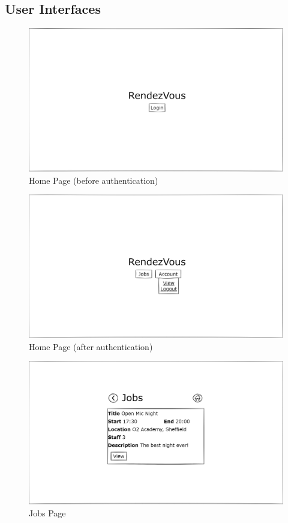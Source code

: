 \subsection{User Interfaces}

\begin{figure}[H]
  \centering
  \includegraphics[width=0.9\linewidth]
  {05 design/assets/ui/home page no auth.png}
  \caption{Home Page (before authentication)}
  \label{fig:homePageNoAuth}
\end{figure}

\begin{figure}[H]
  \centering
  \includegraphics[width=0.9\linewidth]
  {05 design/assets/ui/home page with auth.png}
  \caption{Home Page (after authentication)}
  \label{fig:homePageWithAuth}
\end{figure}

\begin{figure}[H]
  \centering
  \includegraphics[width=0.9\linewidth]
  {05 design/assets/ui/jobs page.png}
  \caption{Jobs Page}
  \label{fig:jobsPage}
\end{figure}

